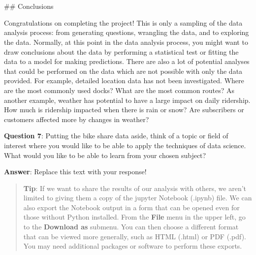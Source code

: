 \documentclass[11pt]{article}
\begin{document}
    \begin{center}
    \end{center}
    { \hspace*{\fill} \\}
    
    \begin{center}
    \end{center}
    { \hspace*{\fill} \\}
    
     \#\# Conclusions

Congratulations on completing the project! This is only a sampling of
the data analysis process: from generating questions, wrangling the
data, and to exploring the data. Normally, at this point in the data
analysis process, you might want to draw conclusions about the data by
performing a statistical test or fitting the data to a model for making
predictions. There are also a lot of potential analyses that could be
performed on the data which are not possible with only the data
provided. For example, detailed location data has not been investigated.
Where are the most commonly used docks? What are the most common routes?
As another example, weather has potential to have a large impact on
daily ridership. How much is ridership impacted when there is rain or
snow? Are subscribers or customers affected more by changes in weather?

\textbf{Question 7}: Putting the bike share data aside, think of a topic
or field of interest where you would like to be able to apply the
techniques of data science. What would you like to be able to learn from
your chosen subject?

\textbf{Answer}: Replace this text with your response!

\begin{quote}
\textbf{Tip}: If we want to share the results of our analysis with
others, we aren't limited to giving them a copy of the jupyter Notebook
(.ipynb) file. We can also export the Notebook output in a form that can
be opened even for those without Python installed. From the
\textbf{File} menu in the upper left, go to the \textbf{Download as}
submenu. You can then choose a different format that can be viewed more
generally, such as HTML (.html) or PDF (.pdf). You may need additional
packages or software to perform these exports.
\end{quote}
\end{document}

